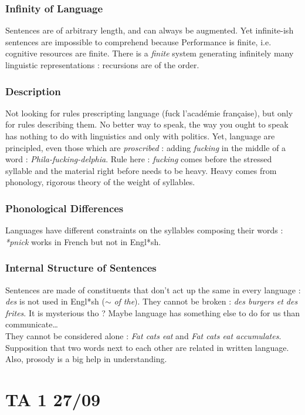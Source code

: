 \documentclass{cours}
\begin{document}
    \subsubsection{Infinity of Language}
        Sentences are of arbitrary length, and can always be augmented. Yet infinite-ish sentences are impossible to comprehend because Performance is finite, i.e. cognitive resources are finite. There is a \textit{finite} system generating infinitely many linguistic representations\! : recursions are of the order.
    \subsubsection{Description}
        Not looking for rules prescripting language (fuck l'académie française), but only for rules describing them. No better way to speak, the way you ought to speak has nothing to do with linguistics and only with politics. Yet, language are principled, even those which are \textit{proscribed}\! : adding \textit{fucking} in the middle of a word\! : \textit{Phila-fucking-delphia}. Rule here\! : \textit{fucking} comes before the stressed syllable and the material right before needs to be heavy. Heavy comes from phonology, rigorous theory of the weight of syllables. 
    \subsubsection{Phonological Differences}
        Languages have different constraints on the syllables composing their words\! : \textit{*pnick} works in French but not in Engl*sh.
    \subsubsection{Internal Structure of Sentences}
        Sentences are made of constituents that don't act up the same in every language\! : \textit{des} is not used in Engl*sh ($\sim$ \textit{of the}). They cannot be broken\! : \textit{des burgers et des frites}. It is mysterious tho ? Maybe language has something else to do for us than communicate\ldots\\
        They cannot be considered alone\! : \textit{Fat cats eat} and \textit{Fat cats eat accumulates}. Supposition that two words next to each other are related in written language. Also, prosody is a big help in understanding. 

\section{TA 1 27/09}
\end{document}
